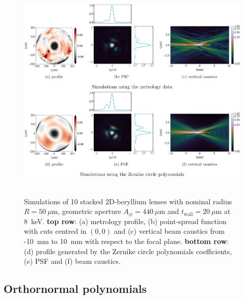 \begin{refsection}
\begin{figure}[t]
        \centering
        {\includegraphics[height=10cm]{figures/ch04/metrology_zernike_simualtionsb.pdf}}
        \caption[Effects of other sources of deviations from the parabolic shape - 10-lens stack]{Simulations of 10 stacked 2D-beryllium lenses with nominal radius $R=50~\mu\text{m}$, geometric aperture $A_{\diameter}=440~\mu\text{m}$ and $t_\text{wall}=20~\mu$m at 8~keV. \textbf{top row}: (a) metrology profile, (b) point-spread function with cuts centred in $(0,0)$ and (c) vertical beam caustics from -10~mm to 10~mm with respect to the focal plane. \textbf{bottom row}: (d) profile generated by the Zernike circle polynomials coefficients, (e) PSF and (f) beam caustics.} \label{fig:metrology_zernike_simualtionsb}
\end{figure}

\subsection{Orthornormal polynomials}\label{sec:orthonormal_polynomials}


\end{refsection}

